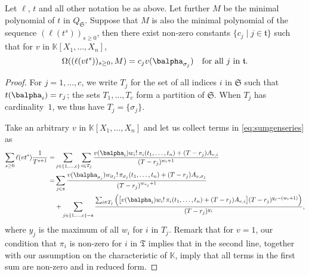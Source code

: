 \documentclass[12pt]{article}
\def\K{\mathbb{K}}
\def\K {\ensuremath{\mathbb{K}}}
\begin{document}
\begin{lemma} \label{lemma:anyv}
	Let $\ell$, $t$ and all other notation be as above. Let further
	$M$ be the minimal polynomial of $t$ in $Q_\mathfrak{S}$. Suppose that 
	$M$ is also the minimal polynomial of the sequence $(\ell(t^s))_{s \ge 0}$,
	then there exist non-zero constants $\{c_j \mid j \in
	\mathfrak{t}\}$  such that for $v$ in
	$\K[X_1,\dots,X_n]$,
	$$\Omega((\ell(v t^s))_{s\ge0},M) = c_{j} v(\balpha_{\sigma_j}) \quad \text{for all $j$ in $\mathfrak{t}$.}$$
\end{lemma}
\begin{proof}
	For $j=1,\dots,c$, we write $T_j$ for the set of all indices $i$ in
	$\mathfrak{S}$ such that $t(\balpha_{i})=r_j$; the sets
	$T_1,\dots,T_c$ form a partition of $\mathfrak{S}$. When $T_j$ has
	cardinality~$1$, we thus have $T_j=\{\sigma_j\}$.
	
	Take an arbitrary $v$ in $\K[X_1,\dots,X_n]$ and let us
	collect terms in \cref{eq:sumgenseries} as
	\begin{align*}
	\sum_{s \ge 0} \ell(v t^s)\frac{1}{T^{s+1}} =&
	\sum_{j \in \{1,\dots,c\}}
	\sum_{i \in T_j} \frac{
		v(\balpha_{i})   w_{i}!\, \pi_{i}(t_1,\dots,t_n)
		+ (T-r_{j} )A_{v,i}}
	{(T-r_{j} )^{w_{i}+1}}\\
	=&
	\sum_{j \in \mathfrak{s}}
	\frac{
		v(\balpha_{\sigma_{j}})  w_{\sigma_j}!\, \pi_{\sigma_j}(t_1,\dots,t_n)
		+ (T-r_{j}  )A_{v,\sigma_j} }
	{(T-r_{j} )^{w_{\sigma_j}+1}}\\
	&+
	\sum_{j \in \{1,\dots,c\}-\mathfrak{s}}
	\frac{   \sum_{i \in T_j} \Big( \big[
		v(\balpha_{i})   w_{i}!\, \pi_{i}(t_1,\dots,t_n)
		 + (T-r_{j}  )A_{v,i} \big ]
		(T-r_{j} )^{y_j-(w_i+1)}\Big)}
	{(T-r_{j} )^{y_j}},
	\end{align*}
	where $y_j$ is the maximum of all $w_i$ for $i$ in $T_j$.  Remark that
	for $v=1$, our condition that $\pi_i$ is non-zero for $i$ in
	$\mathfrak{T}$ implies that in the second line, together with our
	assumption on the characteristic of $\K$, imply that all terms in the
	first sum are non-zero and in reduced form.  
	

\end{proof}
\end{document}
